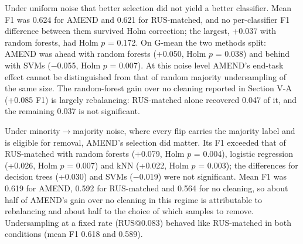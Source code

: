 \documentclass[conference]{IEEEtran}
\begin{document}
Under uniform noise that better selection did not yield a better classifier. Mean F1 was 0.624 for AMEND and 0.621 for RUS-matched, and no per-classifier F1 difference between them survived Holm correction; the largest, +0.037 with random forests, had Holm $p$ = 0.172. On G-mean the two methods split: AMEND was ahead with random forests (+0.050, Holm $p$ = 0.038) and behind with SVMs ($-$0.055, Holm $p$ = 0.007). At this noise level AMEND's end-task effect cannot be distinguished from that of random majority undersampling of the same size. The random-forest gain over no cleaning reported in Section V-A (+0.085 F1) is largely rebalancing: RUS-matched alone recovered 0.047 of it, and the remaining 0.037 is not significant.

Under minority$\rightarrow $majority noise, where every flip carries the majority label and is eligible for removal, AMEND's selection did matter. Its F1 exceeded that of RUS-matched with random forests (+0.079, Holm $p$ = 0.004), logistic regression (+0.026, Holm $p$ = 0.007) and kNN (+0.022, Holm $p$ = 0.003); the differences for decision trees (+0.030) and SVMs ($-$0.019) were not significant. Mean F1 was 0.619 for AMEND, 0.592 for RUS-matched and 0.564 for no cleaning, so about half of AMEND's gain over no cleaning in this regime is attributable to rebalancing and about half to the choice of which samples to remove. Undersampling at a fixed rate (RUS@0.083) behaved like RUS-matched in both conditions (mean F1 0.618 and 0.589).
\end{document}
